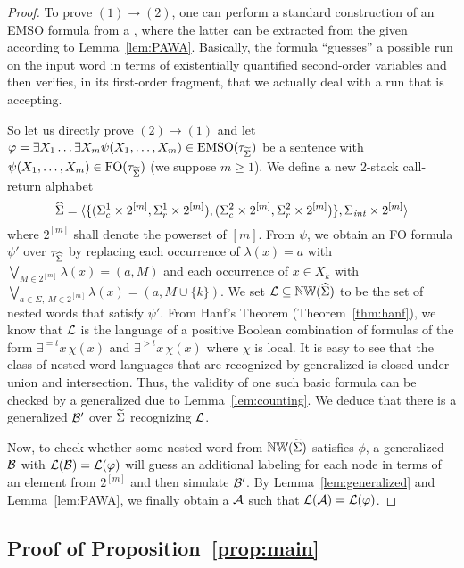 \documentclass{LMCS}
\begin{document}
\begin{proof}
  To prove $(1) \rightarrow (2)$, one can perform a standard construction of
  an EMSO formula from a \tNWA, where the latter can be extracted from the
  given \tVPA according to Lemma~\ref{lem:PAWA}. Basically, the formula
  ``guesses'' a possible run on the input word in terms of existentially
  quantified second-order variables and then verifies, in its first-order
  fragment, that we actually deal with a run that is accepting.

  So let us directly prove $(2) \rightarrow (1)$ and let $\varphi = \exists X_1
  \ldots \exists X_m \psi(X_1,\ldots,X_m) \in \textup{EMSO}(\tau_{\widetilde{\Sigma}})$ be a sentence
  with $\psi(X_1,\ldots,X_m) \in \textup{FO}(\tau_{\widetilde{\Sigma}})$ (we suppose $m \ge 1$). We
  define a new 2-stack call-return alphabet
  \[\widehat{\Sigma}=\langle\{(\Sigma_c^1 \times 2^{[m]},\Sigma_r^1 \times
  2^{[m]}),(\Sigma_c^2 \times 2^{[m]},\Sigma_r^2 \times 2^{[m]})\},\Sigma_{\mathit{int}}
  \times 2^{[m]}\rangle\] where $2^{[m]}$ shall denote the powerset of $[m]$.
  From $\psi$, we obtain an FO formula $\psi'$ over $\tau_{\widehat{\Sigma}}$ by
  replacing each occurrence of $\lambda(x) = a$ with $\bigvee_{M \in 2^{[m]}}
  \lambda(x) = (a,M)$ and each occurrence of $x \in X_k$ with $\bigvee_{a \in
    \Sigma,~M \in 2^{[m]}} \lambda(x) = (a,M \cup \{k\})$. We set $\mathcal{L}
  \mathrel{\subseteq} \mathbb{NW}(\widehat{\Sigma})$ to be the set of nested words that
  satisfy $\psi'$. From Hanf's Theorem (Theorem~\ref{thm:hanf}), we know that
  $\mathcal{L}$ is the language of a positive Boolean combination of formulas of the
  form $\exists^{=t}x\, \chi(x)$ and $\exists^{>t}x\, \chi(x)$ where $\chi$ is
  local. It is easy to see that the class of nested-word languages that are
  recognized by generalized \tNWA is closed under union and intersection.
  Thus, the validity of one such basic formula can be checked by a generalized
  \tNWA due to Lemma~\ref{lem:counting}. We deduce that there is a generalized
  \tNWA $\mathcal{B}'$ over $\widetilde{\Sigma}$ recognizing $\mathcal{L}$.

  Now, to check whether some nested word from $\mathbb{NW}(\widetilde{\Sigma})$ satisfies
  $\phi$, a generalized \tNWA $\mathcal{B}$ with $\mathcal{L}(\mathcal{B}) = \mathcal{L}(\varphi)$ will guess
  an additional labeling for each node in terms of an element from $2^{[m]}$
  and then simulate $\mathcal{B}'$. By Lemma~\ref{lem:generalized} and
  Lemma~\ref{lem:PAWA}, we finally obtain a \tVPA $\mathcal{A}$ such that $\mathcal{L}(\mathcal{A})
  = \mathcal{L}(\varphi)$.
\end{proof}


\subsection{Proof of Proposition~\ref{prop:main}}\label{sec:sphereaut}
\end{document}
